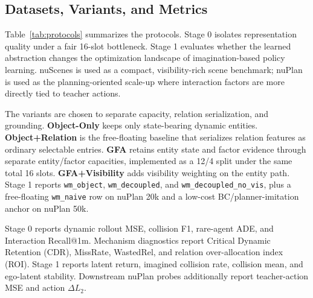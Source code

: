 \documentclass[journal]{IEEEtran}
\newcommand{\method}{\textsc{GFA}}
\begin{document}
\subsection{Datasets, Variants, and Metrics}
Table~\ref{tab:protocols} summarizes the protocols. Stage 0 isolates representation quality under a fair 16-slot bottleneck. Stage 1 evaluates whether the learned abstraction changes the optimization landscape of imagination-based policy learning. nuScenes is used as a compact, visibility-rich scene benchmark; nuPlan is used as the planning-oriented scale-up where interaction factors are more directly tied to teacher actions.

\begin{table}[!t]
\caption{Experimental protocols. The main paper uses latent and offline planner-like probes to isolate representation and policy-learning behavior before claiming full closed-loop benchmark performance.}
\label{tab:protocols}
\centering
{}
\end{table}

The variants are chosen to separate capacity, relation serialization, and grounding. \textbf{Object-Only} keeps only state-bearing dynamic entities. \textbf{Object+Relation} is the free-floating baseline that serializes relation features as ordinary selectable entries. \textbf{\method} retains entity state and factor evidence through separate entity/factor capacities, implemented as a 12/4 split under the same total 16 slots. \textbf{\method+Visibility} adds visibility weighting on the entity path. Stage 1 reports \texttt{wm\_object}, \texttt{wm\_decoupled}, and \texttt{wm\_decoupled\_no\_vis}, plus a free-floating \texttt{wm\_naive} row on nuPlan 20k and a low-cost BC/planner-imitation anchor on nuPlan 50k.

Stage 0 reports dynamic rollout MSE, collision F1, rare-agent ADE, and Interaction Recall@1m. Mechanism diagnostics report Critical Dynamic Retention (CDR), MissRate, WastedRel, and relation over-allocation index (ROI). Stage 1 reports latent return, imagined collision rate, collision mean, and ego-latent stability. Downstream nuPlan probes additionally report teacher-action MSE and action $\Delta L_2$.
\end{document}
